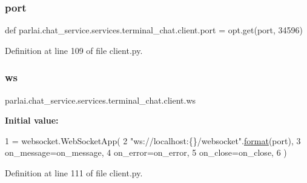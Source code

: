 \subsubsection{\texorpdfstring{port}{port}}
{\footnotesize\ttfamily def parlai.\+chat\+\_\+service.\+services.\+terminal\+\_\+chat.\+client.\+port = opt.\+get(\textquotesingle{}port\textquotesingle{}, 34596)}



Definition at line 109 of file client.\+py.

\mbox{\label{namespaceparlai_1_1chat__service_1_1services_1_1terminal__chat_1_1client_a8cf84390ff82d21619917c2366685540}} 
\subsubsection{\texorpdfstring{ws}{ws}}
{\footnotesize\ttfamily parlai.\+chat\+\_\+service.\+services.\+terminal\+\_\+chat.\+client.\+ws}

{\bfseries Initial value\+:}
\begin{DoxyCode}
1 =  websocket.WebSocketApp(
2         \textcolor{stringliteral}{"ws://localhost:\{\}/websocket"}.\hyperlink{namespaceparlai_1_1chat__service_1_1services_1_1messenger_1_1shared__utils_a32e2e2022b824fbaf80c747160b52a76}{format}(port),
3         on\_message=on\_message,
4         on\_error=on\_error,
5         on\_close=on\_close,
6     )
\end{DoxyCode}


Definition at line 111 of file client.\+py.

